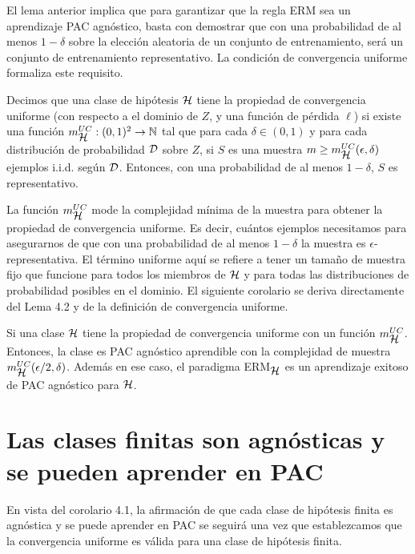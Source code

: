 El lema anterior implica que para garantizar que la regla ERM sea un aprendizaje PAC agnóstico, basta con demostrar que con una probabilidad de al menos $1 -\delta$ sobre la elección aleatoria de un conjunto de entrenamiento, será un conjunto de entrenamiento representativo. La condición de convergencia uniforme formaliza este requisito.

\begin{def.} Decimos que una clase de hipótesis $\mathop{\mbox{$\mathcal{H}$}}\nolimits$ tiene la propiedad de convergencia uniforme (con respecto a el dominio de $Z$, y una función de pérdida $\ell$) si existe una función $m_{\mathop{\mbox{$\mathcal{H}$}}\nolimits}^{UC}:(0,1)^2 \to\mathop{\mbox{$\mathbb{N}$}}\nolimits$ tal que para cada $\delta \in (0,1)$ y para cada distribución de probabilidad $\mathop{\mbox{$\mathcal{D}$}}\nolimits$ sobre $Z$, si $S$ es una muestra $m \geq m_{\mathop{\mbox{$\mathcal{H}$}}\nolimits}^{UC}(\epsilon,\delta)$ ejemplos i.i.d. según $\mathop{\mbox{$\mathcal{D}$}}\nolimits$. Entonces, con una probabilidad de al menos $1-\delta$, $S$ es representativo.
\end{def.}

La función $m_{\mathop{\mbox{$\mathcal{H}$}}\nolimits}^{UC}$ mode la complejidad mínima de la muestra para obtener la propiedad de convergencia uniforme. Es decir, cuántos ejemplos necesitamos para asegurarnos de que con una probabilidad de al menos $1-\delta$ la muestra es $\epsilon$-representativa. El término uniforme aquí se refiere a tener un tamaño de muestra fijo que funcione para todos los miembros de $\mathop{\mbox{$\mathcal{H}$}}\nolimits$ y para todas las distribuciones de probabilidad posibles en el dominio. El siguiente corolario se deriva directamente del Lema 4.2 y de la definición de convergencia uniforme.

\begin{cor}
    Si una clase $\mathop{\mbox{$\mathcal{H}$}}\nolimits$ tiene la propiedad de convergencia uniforme con un función $m_{\mathop{\mbox{$\mathcal{H}$}}\nolimits}^{UC}$. Entonces, la clase es PAC agnóstico aprendible con la complejidad de muestra $m_{\mathop{\mbox{$\mathcal{H}$}}\nolimits}^{UC}(\epsilon/2,\delta)$. Además en ese caso, el paradigma ERM$_{\mathop{\mbox{$\mathcal{H}$}}\nolimits}$ es un aprendizaje exitoso de PAC agnóstico para $\mathop{\mbox{$\mathcal{H}$}}\nolimits$.
\end{cor}

\section{Las clases finitas son agnósticas y se pueden aprender en PAC}
En vista del corolario 4.1, la afirmación de que cada clase de hipótesis finita es agnóstica y se puede aprender en PAC se seguirá una vez que establezcamos que la convergencia uniforme es válida para una clase de hipótesis finita. \\


